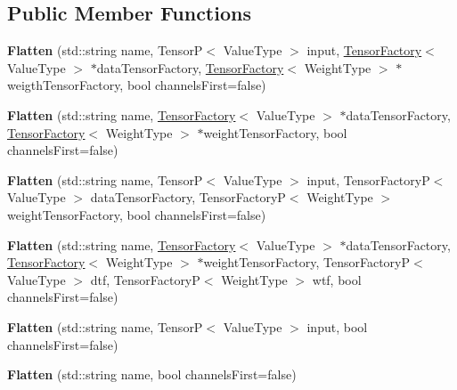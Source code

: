 \subsection*{Public Member Functions}
\begin{DoxyCompactItemize}
\item 
\mbox{\label{classFlatten_a5ceaa436f4896997a0867a95c995ae23}} 
{\bfseries Flatten} (std\+::string name, TensorP$<$ Value\+Type $>$ input, \hyperlink{classTensorFactory}{Tensor\+Factory}$<$ Value\+Type $>$ $\ast$data\+Tensor\+Factory, \hyperlink{classTensorFactory}{Tensor\+Factory}$<$ Weight\+Type $>$ $\ast$weigth\+Tensor\+Factory, bool channels\+First=false)
\item 
\mbox{\label{classFlatten_ae9f1c432597e0d7443838fb71a29599e}} 
{\bfseries Flatten} (std\+::string name, \hyperlink{classTensorFactory}{Tensor\+Factory}$<$ Value\+Type $>$ $\ast$data\+Tensor\+Factory, \hyperlink{classTensorFactory}{Tensor\+Factory}$<$ Weight\+Type $>$ $\ast$weight\+Tensor\+Factory, bool channels\+First=false)
\item 
\mbox{\label{classFlatten_a299432e9970733685ded27755243c38b}} 
{\bfseries Flatten} (std\+::string name, TensorP$<$ Value\+Type $>$ input, Tensor\+FactoryP$<$ Value\+Type $>$ data\+Tensor\+Factory, Tensor\+FactoryP$<$ Weight\+Type $>$ weight\+Tensor\+Factory, bool channels\+First=false)
\item 
\mbox{\label{classFlatten_a0b39a1367b64fc6f1ac5feb4a2729f89}} 
{\bfseries Flatten} (std\+::string name, \hyperlink{classTensorFactory}{Tensor\+Factory}$<$ Value\+Type $>$ $\ast$data\+Tensor\+Factory, \hyperlink{classTensorFactory}{Tensor\+Factory}$<$ Weight\+Type $>$ $\ast$weight\+Tensor\+Factory, Tensor\+FactoryP$<$ Value\+Type $>$ dtf, Tensor\+FactoryP$<$ Weight\+Type $>$ wtf, bool channels\+First=false)
\item 
\mbox{\label{classFlatten_a11b0e0195b339da71b69f55c97fb39a4}} 
{\bfseries Flatten} (std\+::string name, TensorP$<$ Value\+Type $>$ input, bool channels\+First=false)
\item 
\mbox{\label{classFlatten_a957a897da50de0eb06450b39323c9616}} 
{\bfseries Flatten} (std\+::string name, bool channels\+First=false)
\item 

\end{DoxyCompactItemize}
